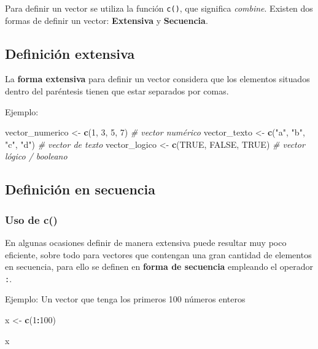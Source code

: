 \documentclass[
]{book}
\newenvironment{Shaded}{\begin{snugshade}}{\end{snugshade}}
\newcommand{\CommentTok}[1]{\textcolor[rgb]{0.56,0.35,0.01}{\textit{#1}}}
\newcommand{\ConstantTok}[1]{\textcolor[rgb]{0.56,0.35,0.01}{#1}}
\newcommand{\DecValTok}[1]{\textcolor[rgb]{0.00,0.00,0.81}{#1}}
\newcommand{\FunctionTok}[1]{\textcolor[rgb]{0.13,0.29,0.53}{\textbf{#1}}}
\newcommand{\NormalTok}[1]{#1}
\newcommand{\OtherTok}[1]{\textcolor[rgb]{0.56,0.35,0.01}{#1}}
\newcommand{\SpecialCharTok}[1]{\textcolor[rgb]{0.81,0.36,0.00}{\textbf{#1}}}
\newcommand{\StringTok}[1]{\textcolor[rgb]{0.31,0.60,0.02}{#1}}
\begin{document}
Para definir un vector se utiliza la función \texttt{c()}, que significa \emph{combine}.
Existen dos formas de definir un vector: \textbf{Extensiva} y \textbf{Secuencia}.

\subsection{Definición extensiva}\label{definiciuxf3n-extensiva}

La \textbf{forma extensiva} para definir un vector considera que los elementos situados dentro del paréntesis tienen que estar separados por comas.

Ejemplo:

\begin{Shaded}
\begin{Highlighting}[]
\NormalTok{vector\_numerico }\OtherTok{\textless{}{-}} \FunctionTok{c}\NormalTok{(}\DecValTok{1}\NormalTok{, }\DecValTok{3}\NormalTok{, }\DecValTok{5}\NormalTok{, }\DecValTok{7}\NormalTok{)      }\CommentTok{\# vector numérico}
\NormalTok{vector\_texto }\OtherTok{\textless{}{-}} \FunctionTok{c}\NormalTok{(}\StringTok{"a"}\NormalTok{, }\StringTok{"b"}\NormalTok{, }\StringTok{"c"}\NormalTok{, }\StringTok{"d"}\NormalTok{) }\CommentTok{\# vector de texto}
\NormalTok{vector\_logico }\OtherTok{\textless{}{-}} \FunctionTok{c}\NormalTok{(}\ConstantTok{TRUE}\NormalTok{, }\ConstantTok{FALSE}\NormalTok{, }\ConstantTok{TRUE}\NormalTok{) }\CommentTok{\# vector lógico / booleano}
\end{Highlighting}
\end{Shaded}

\subsection{Definición en secuencia}\label{definiciuxf3n-en-secuencia}

\subsubsection{Uso de c()}\label{uso-de-c}

En algunas ocasiones definir de manera extensiva puede resultar muy poco eficiente, sobre todo para vectores que contengan una gran cantidad de elementos en secuencia, para ello se definen en \textbf{forma de secuencia} empleando el operador \texttt{:}.

Ejemplo:
Un vector que tenga los primeros 100 números enteros

\begin{Shaded}
\begin{Highlighting}[]
\NormalTok{x }\OtherTok{\textless{}{-}} \FunctionTok{c}\NormalTok{(}\DecValTok{1}\SpecialCharTok{:}\DecValTok{100}\NormalTok{)}

\NormalTok{x}
\end{Highlighting}
\end{Shaded}
\end{document}
